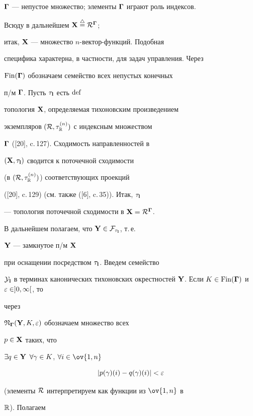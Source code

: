 $\boldsymbol \Gamma$ --- непустое множество; элементы $\boldsymbol \Gamma$ играют роль индексов.


Всюду в дальнейшем ${\bold X} \overset{\triangle}{=}{} {{\cal R}^{\boldsymbol \Gamma}}$;


итак, ${\bold X}$ --- множество $n$-вектор-функций. Подобная


специфика характерна, в частности, для задач управления. Через


${\operatorname{Fin}}(\boldsymbol \Gamma)$ обозначаем семейство всех непустых конечных


п/м $\boldsymbol \Gamma$. Пусть ${\tau}_{\bold l}$ есть $\operatorname{def}$


топология ${\bold X}$, определяемая тихоновским произведением


экземпляров $({\cal R},{{\tau}_{\Bbb R}^{(n)}})$ с индексным множеством


$\boldsymbol \Gamma$ ([20], c.\,127). Сходимость направленностей в


$({\bold X},{{\tau}_{\bold l}})$ сводится к поточечной сходимости


(в $({\cal R},{{\tau}_{\Bbb R}^{(n)}})$) соответствующих проекций


([20], c.\,129) (см. также ([6], c.\,35)). Итак, ${\tau}_{\bold l}$


--- топология поточечной сходимости в ${\bold X} = {{\cal R}^{\boldsymbol \Gamma}}$.


В дальнейшем полагаем, что ${\bold Y} \in


{{\cal F}_{{\tau}_{\bold l}}}$, т.\,е.


${\bold Y}$ --- замкнутое п/м ${\bold X}$


при оснащении посредством ${\tau}_{\bold l}$. Введем семейство


${\cal Y}_{\bold l}$ в терминах канонических тихоновских окрестностей ${\bold


Y}$. Если $K \in {\Fin}(\mG)$ и $\var \in ]0,\infty[$, то


через


${{\frak N}_{\boldsymbol \Gamma}}({\bold Y},K,\varepsilon)$ обозначаем множество всех


$p \in {\bold X}$ таких, что


$\exi{q} \in


{\bold Y}$ $\fo{\gamma} \in K$, $\fo{i} \in \ov{1,n}$


$$


|{p(\gamma)(i)} - {q(\gamma)(i)}| < \var


$$


(элементы ${\cal R}$ интерпретируем как функции из $\ov{1,n}$ в


${\Bbb R}$). Полагаем


